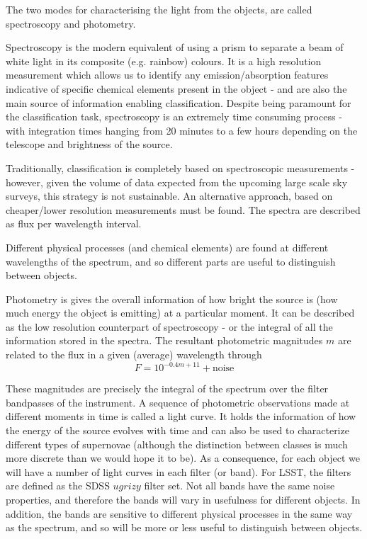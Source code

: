 \documentclass[\docopts]{\docclass}
\begin{document}
The two modes for characterising the light from the objects, are called spectroscopy and photometry.

Spectroscopy is the modern equivalent of using a prism to separate a beam of white light in its composite (e.g. rainbow) colours. It is a high resolution measurement which allows us to identify any emission/absorption features indicative of specific chemical elements present in the object - and are also the main source of information enabling classification. Despite being paramount for the classification task, spectroscopy is an extremely time consuming process - with integration times hanging from 20 minutes to a few hours depending on the telescope and brightness of the source.

Traditionally, classification is completely based on spectroscopic measurements - however, given the volume of data expected from the upcoming large scale sky surveys, this strategy is not sustainable. An alternative approach, based on cheaper/lower resolution measurements must be found. The spectra are described as flux per wavelength interval. 

Different physical processes (and chemical elements) are found at different wavelengths of the spectrum, and so different parts are useful to distinguish between objects.

Photometry is gives the overall information of how bright the source is (how much energy the object is emitting) at a particular moment. It can be described as the low resolution counterpart of spectroscopy - or the integral of all the information stored in the spectra. The resultant photometric magnitudes $m$ are related to the flux in a given (average) wavelength through 
\begin{equation}
F = 10^{-0.4m+11} + \mbox{noise}
\end{equation}

These magnitudes are precisely the integral of the spectrum over the filter bandpasses of the instrument. A sequence of photometric observations made at different moments in time is called a light curve. It holds the information of how the energy of the source evolves with time and can also be used to characterize different types of supernovae (although the distinction between classes is much more discrete than we would hope it to be). As a consequence, for each object we will have a number of light curves in each filter (or band). For LSST, the filters are defined as the SDSS $ugrizy$ filter set. Not all bands have the same noise properties, and therefore the bands will vary in usefulness for different objects. In addition, the bands are sensitive to different physical processes in the same way as the spectrum, and so will be more or less useful to distinguish between objects.
\end{document}
